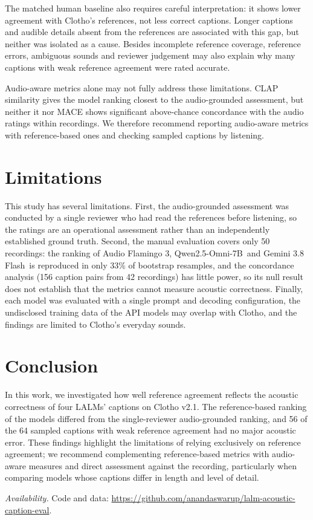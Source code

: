\documentclass{article}
\newcommand{\gem}{Gemini 3.8 Flash}
\newcommand{\qwen}{Qwen2.5-Omni-7B}
\newcommand{\af}{Audio Flamingo 3}
\begin{document}
The matched human baseline also requires careful interpretation: it shows lower agreement with Clotho's references,
not less correct captions. Longer captions and audible details absent from the references are associated with this
gap, but neither was isolated as a cause. Besides incomplete
reference coverage, reference errors, ambiguous sounds and reviewer judgement may also explain why many captions with
weak reference agreement were rated accurate.

Audio-aware metrics alone may not fully address these limitations. CLAP similarity gives the model ranking closest to
the audio-grounded assessment, but neither it nor MACE shows significant above-chance concordance with the audio
ratings within recordings. We therefore recommend reporting
audio-aware metrics with reference-based ones and checking sampled captions by listening.

\section{Limitations}
\label{sec:limitations}

This study has several limitations. First, the audio-grounded assessment was conducted by a single reviewer who had
read the references before listening, so the ratings are an operational assessment rather than an independently
established ground truth. Second, the manual evaluation covers only 50 recordings: the ranking of \af, \qwen\ and \gem\
is reproduced in only 33\% of bootstrap resamples, and the concordance analysis (156 caption pairs from 42
recordings) has little power, so its null result does not establish that the metrics cannot measure acoustic
correctness. Finally, each model was evaluated with a single prompt and decoding configuration, the undisclosed
training data of the API models may overlap with Clotho, and the findings are limited to Clotho's everyday sounds.

\section{Conclusion}
\label{sec:conclusion}

In this work, we investigated how well reference agreement reflects the acoustic correctness of four LALMs'
captions on Clotho v2.1. The reference-based ranking of the models differed from the
single-reviewer audio-grounded ranking, and 56 of the 64 sampled captions with weak reference agreement had no major
acoustic error. These findings highlight the limitations of relying exclusively on reference agreement; we
recommend complementing reference-based metrics with audio-aware measures and direct assessment against the
recording, particularly when comparing models whose captions differ in length and level of detail.

\emph{Availability.} Code and data:
\url{https://github.com/anandaswarup/lalm-acoustic-caption-eval}.

\clearpage



\end{document}
